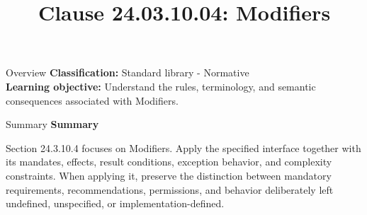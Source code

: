 \documentclass[10pt,letterpaper]{article}
\title{Clause 24.03.10.04: Modifiers}
\author{}
\date{}
\begin{document}
\maketitle
\begin{CornellOverviewBox}{Overview}
\textbf{Classification:} Standard library - Normative\\[2pt]
\textbf{Learning objective:} Understand the rules, terminology, and semantic consequences associated with Modifiers.
\end{CornellOverviewBox}\begin{CornellSummaryBox}{Summary}
{\sffamily\bfseries\color{Accent} Summary}\par\vspace{3pt}Section 24.3.10.4 focuses on Modifiers. Apply the specified interface together with its mandates, effects, result conditions, exception behavior, and complexity constraints. When applying it, preserve the distinction between mandatory requirements, recommendations, permissions, and behavior deliberately left undefined, unspecified, or implementation-defined.
\end{CornellSummaryBox}
\end{document}
